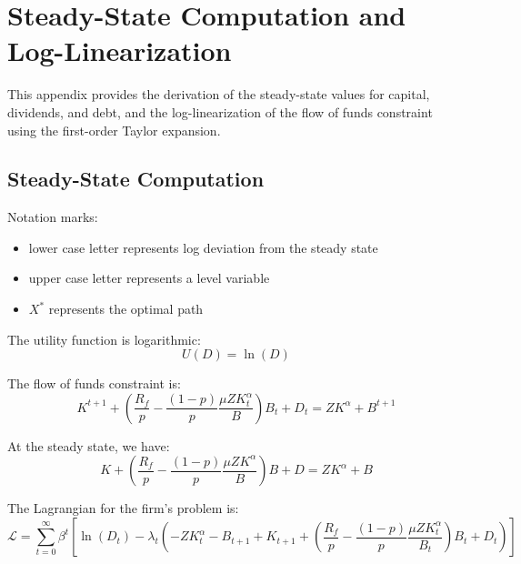 \section{Steady-State Computation and Log-Linearization}
\label{sec:steady-state-computation}

This appendix provides the derivation of the steady-state values for capital, dividends, and debt, and the log-linearization of the flow of funds constraint using the first-order Taylor expansion.

\subsection{Steady-State Computation}
Notation marks:
\begin{itemize}
    \item lower case letter represents log deviation from the steady state
    \item upper case letter represents a level variable
    \item \(X^*\) represents the optimal path
\end{itemize}
The utility function is logarithmic:
\begin{equation}
U(D) = \ln(D)
\end{equation}

The flow of funds constraint is:
\begin{equation}
K^{t+1} + \left( \frac{R_f}{p} - \frac{(1-p)}{p} \frac{\mu Z K_t^\alpha}{B} \right) B_t + D_t = Z K^\alpha + B^{t+1}
\end{equation}

At the steady state, we have:
\begin{equation}
K + \left( \frac{R_f}{p} - \frac{(1-p)}{p} \frac{\mu Z K^\alpha}{B} \right) B + D = Z K^\alpha + B
\end{equation}

The Lagrangian for the firm's problem is:
\begin{equation}
\mathcal{L} = \sum_{t=0}^\infty \beta^t \left[ \ln(D_t) - \lambda_t \left( - Z K_t^\alpha - B_{t+1} + K_{t+1} + \left( \frac{R_f}{p} - \frac{(1-p)}{p} \frac{\mu Z K_t^\alpha}{B_t} \right) B_t + D_t \right) \right]
\end{equation}

